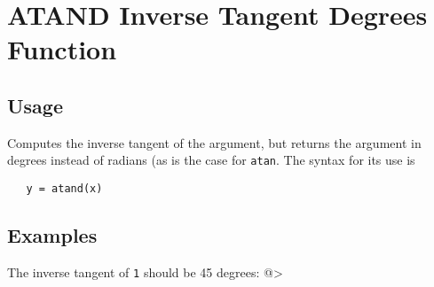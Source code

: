 \section{ATAND Inverse Tangent Degrees Function}

\subsection{Usage}

Computes the inverse tangent of the argument, but returns
the argument in degrees instead of radians (as is the case
for \verb|atan|. The syntax for its use is
\begin{verbatim}
   y = atand(x)
\end{verbatim}
\subsection{Examples}

The inverse tangent of \verb|1| should be 45 degrees:
@>
